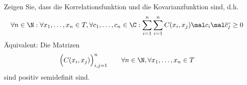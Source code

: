 \begin{aufgabenr}\label{aufg:8}\enter
	Zeigen Sie, dass die Korrelationsfunktion und die Kovarianzfunktion  sind, d.h.
	\begin{align*}
		\forall n\in\N:\forall x_1,\ldots,x_n\in T,\forall c_1,\ldots,c_n\in\C:\sum\limits_{i=1}^n\sum\limits_{i=1}^n C(x_i,x_j)\mal c_i\mal\overline{c_j}\geq0
	\end{align*}
	Äquivalent: Die Matrizen
	\begin{align*}
		\Big( C(x_i,x_j)\Big)_{i,j=1}^n\qquad\forall n\in\N,\forall x_1,\ldots,x_n\in T
	\end{align*}
	sind positiv semidefinit sind.
\end{aufgabenr}

